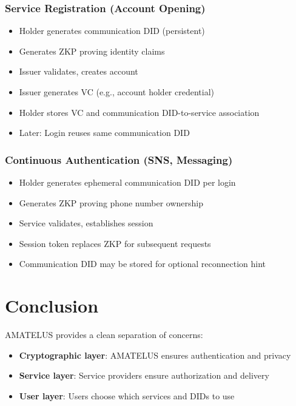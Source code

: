 \subsection{Service Registration (Account Opening)}

\begin{itemize}
  \item Holder generates communication DID (persistent)
  \item Generates ZKP proving identity claims
  \item Issuer validates, creates account
  \item Issuer generates VC (e.g., account holder credential)
  \item Holder stores VC and communication DID-to-service association
  \item Later: Login reuses same communication DID
\end{itemize}

\subsection{Continuous Authentication (SNS, Messaging)}

\begin{itemize}
  \item Holder generates ephemeral communication DID per login
  \item Generates ZKP proving phone number ownership
  \item Service validates, establishes session
  \item Session token replaces ZKP for subsequent requests
  \item Communication DID may be stored for optional reconnection hint
\end{itemize}

\chapter{Conclusion}

AMATELUS provides a clean separation of concerns:

\begin{itemize}
  \item \textbf{Cryptographic layer}: AMATELUS ensures authentication and privacy
  \item \textbf{Service layer}: Service providers ensure authorization and delivery
  \item \textbf{User layer}: Users choose which services and DIDs to use
\end{itemize}

